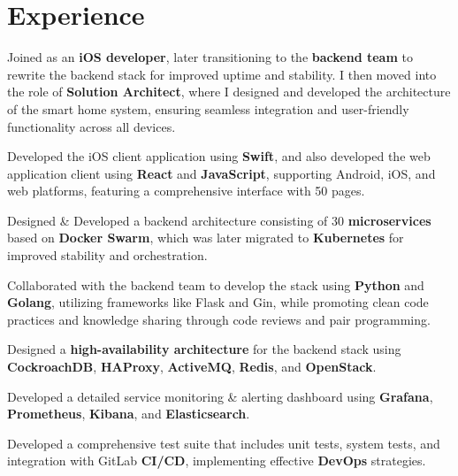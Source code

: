 \documentclass[letterpaper]{deedy-resume} %
\begin{document}
\hfill
%
%
\begin{minipage}[t]{0.66\textwidth} %


\section{Experience}


\vspace{\topsep} %
\begin{tightitemize}
\item Joined as an {\bf iOS developer}, later transitioning to the {\bf backend team} to rewrite the backend stack for improved uptime and stability. I then moved into the role of {\bf Solution Architect}, where I designed and developed the architecture of the smart home system, ensuring seamless integration and user-friendly functionality across all devices.
\item Developed the iOS client application using {\bf Swift}, and also developed the web application client using {\bf React} and {\bf JavaScript}, supporting Android, iOS, and web platforms, featuring a comprehensive interface with 50 pages.
\item Designed \& Developed a backend architecture consisting of 30 {\bf microservices} based on {\bf Docker Swarm}, which was later migrated to {\bf Kubernetes} for improved stability and orchestration.
\item Collaborated with the backend team to develop the stack using {\bf Python} and {\bf Golang}, utilizing frameworks like Flask and Gin, while promoting clean code practices and knowledge sharing through code reviews and pair programming.
\item Designed a {\bf high-availability architecture} for the backend stack using {\bf CockroachDB}, {\bf HAProxy}, {\bf ActiveMQ}, {\bf Redis}, and {\bf OpenStack}.
\item Developed a detailed service monitoring \& alerting dashboard using {\bf Grafana}, {\bf Prometheus}, {\bf Kibana}, and {\bf Elasticsearch}.
\item Developed a comprehensive test suite that includes unit tests, system tests, and integration with GitLab {\bf CI/CD}, implementing effective {\bf DevOps} strategies.


\end{tightitemize}
\end{minipage}
\end{document}
